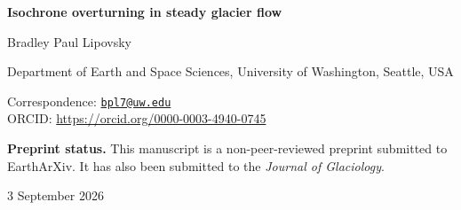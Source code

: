 \documentclass[12pt,letterpaper]{article}
\begin{document}
\begin{center}
{\Large\bfseries Isochrone overturning in steady glacier flow\par}

\vspace{1.5em}
{\large Bradley Paul Lipovsky\par}

\vspace{0.75em}
Department of Earth and Space Sciences, University of Washington, Seattle, USA

\vspace{0.5em}
Correspondence: \href{mailto:bpl7@uw.edu}{\texttt{bpl7@uw.edu}}\\
ORCID: \url{https://orcid.org/0000-0003-4940-0745}
\end{center}

\vspace{2em}
\noindent\textbf{Preprint status.}
This manuscript is a non-peer-reviewed preprint submitted to \mbox{EarthArXiv}.
It has also been submitted to the \emph{Journal of Glaciology}.

\vfill
\begin{center}
3 September 2026
\end{center}

\clearpage

\end{document}
